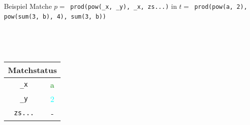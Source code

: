 \begin{frame}{Beispiel}
	Matche $p =$\verb~ prod(pow(_x, _y), _x, zs...)~ in 
	$t =$\verb~ prod(pow(a, 2), pow(sum(3, b), 4), sum(3, b))~
	~\\
	\begin{columns}[c] %
		\scriptsize
        \begin{column}{0.3\textwidth}	
			~\\~\\
			\begin{tabular} {c|c}
			\multicolumn{2}{c}{Matchstatus}\\
			\hline
			\verb~_x~      & \textcolor{green}{a}            \\
			\verb~_y~      & \textcolor{cyan}{2}            \\
			\verb~zs...~   & -            
			\end{tabular}
        \end{column}
		
        \begin{column}{0.3\textwidth}	
        \end{column}
	\end{columns}
\end{frame}


